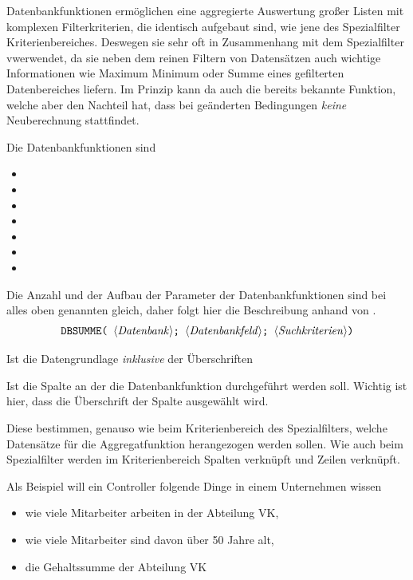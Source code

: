 Datenbankfunktionen ermöglichen eine aggregierte Auswertung großer Listen mit komplexen Filterkriterien, die identisch aufgebaut sind, wie jene des Spezialfilter Kriterienbereiches. Deswegen sie sehr oft in Zusammenhang mit dem Spezialfilter vwerwendet, da sie neben dem reinen Filtern von Datensätzen auch wichtige Informationen wie Maximum Minimum oder Summe eines gefilterten Datenbereiches liefern. Im Prinzip kann da auch die bereits bekannte  Funktion, welche aber den Nachteil hat, dass bei geänderten Bedingungen \textit{keine} Neuberechnung stattfindet.

Die Datenbankfunktionen sind

\begin{multicols}{2}
	\begin{itemize}
	\smallitemize
    	\item {}
	    \item {}
    	\item {}
    	\item {}
	    \item {}
    	\item {}
    	\item {}
	\end{itemize}
\end{multicols}

Die Anzahl und der Aufbau der Parameter der Datenbankfunktionen sind bei alles oben genannten gleich, daher folgt hier die Beschreibung anhand von .
$$ \text{\stmt{DBSUMME( \syntax{Datenbank}; \syntax{Datenbankfeld}; \syntax{Suchkriterien})}} $$
\pagebreak
\begin{description}[labelindent=0cm, leftmargin=3.5cm, font=\mdseries, labelwidth=3cm,style=nextline]
\smallitemize
\item[\syntax{Datenbank}]Ist die Datengrundlage \textit{inklusive} der Überschriften
\item[\syntax{Datenbankfeld}] Ist die Spalte an der die Datenbankfunktion durchgeführt werden soll. Wichtig ist hier, dass die Überschrift der Spalte ausgewählt wird.
\item[\syntax{Suchkriterien}] Diese bestimmen, genauso wie beim Kriterienbereich des Spezialfilters, welche Datensätze für die Aggregatfunktion herangezogen werden sollen. Wie auch beim Spezialfilter werden im Kriterienbereich Spalten  verknüpft und Zeilen  verknüpft.
\end{description}
%
Als Beispiel will ein Controller folgende Dinge in einem Unternehmen wissen
\begin{itemize}
	\smallitemize
	\item wie viele Mitarbeiter arbeiten in der Abteilung VK,
	\item wie viele Mitarbeiter sind davon über 50 Jahre alt,
	\item die Gehaltssumme der Abteilung VK
\end{itemize}

